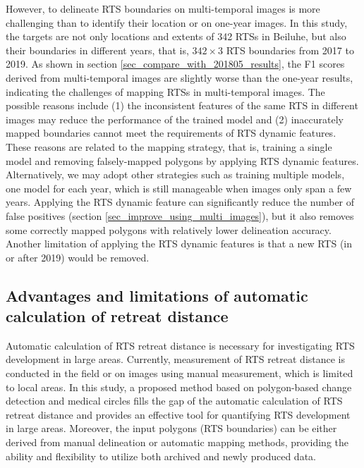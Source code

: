 \documentclass[authoryear,preprint,review,12pt]{elsarticle}
\begin{document}
However, to delineate RTS boundaries on multi-temporal images is more challenging than to identify their location or on one-year images. 
In this study, the targets are not only locations and extents of 342 RTSs in Beiluhe, but also their boundaries in different years, that is, $342\times3$ RTS boundaries from 2017 to 2019.
As shown in section \ref{sec_compare_with_201805_results}, the F1 scores derived from multi-temporal images are slightly worse than the one-year results, indicating the challenges of mapping RTSs in multi-temporal images. 
The possible reasons include (1) the inconsistent features of the same RTS in different images may reduce the performance of the trained model 
and (2) inaccurately mapped boundaries cannot meet the requirements of RTS dynamic features. 
These reasons are related to the mapping strategy, that is, training a single model and removing falsely-mapped polygons by applying RTS dynamic features.  
Alternatively, we may adopt other strategies such as training multiple models, one model for each year,  which is still manageable when images only span a few years.
Applying the RTS dynamic feature can significantly reduce the number of false positives (section \ref{sec_improve_using_multi_images}), but it also removes some correctly mapped polygons with relatively lower delineation accuracy. 
Another limitation of applying the RTS dynamic features is that a new RTS (in or after 2019) would be removed. 



\subsection{Advantages and limitations of automatic calculation of retreat distance}
\label{sec_diss_retreat_distance}

Automatic calculation of RTS retreat distance is necessary for investigating RTS development in large areas.
Currently, measurement of RTS retreat distance is conducted in the field or on images using manual measurement, which is limited to local areas. 
In this study, a proposed method based on polygon-based change detection and medical circles fills the gap of the automatic calculation of RTS retreat distance 
and provides an effective tool for quantifying RTS development in large areas. 
Moreover, the input polygons (RTS boundaries) can be either derived from manual delineation or automatic mapping methods, 
providing the ability and flexibility to utilize both archived and newly produced data.
\end{document}
